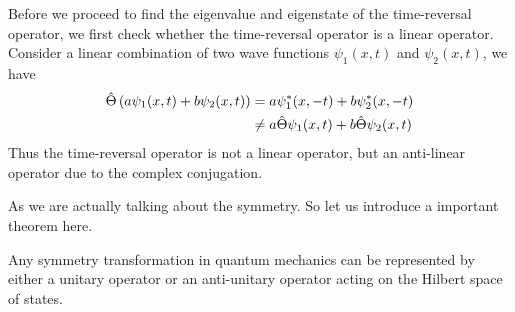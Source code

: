 Before we proceed to find the eigenvalue and eigenstate of the time-reversal operator, we first check whether the time-reversal operator is a linear operator. Consider a linear combination of two wave functions $\psi_1(x,t)$ and $\psi_2(x,t)$, we have
\begin{align*}
    \hat{\Theta} \left( a \psi_1(x,t) + b \psi_2(x,t) \right) &= a \psi_1^*(x,-t) + b \psi_2^*(x,-t) \\
    &\neq a \hat{\Theta} \psi_1(x,t) + b \hat{\Theta} \psi_2(x,t)
\end{align*}
Thus the time-reversal operator is not a linear operator, but an anti-linear operator due to the complex conjugation.

As we are actually talking about the symmetry. So let us introduce a important theorem here.
\begin{theorem}
    Any symmetry transformation in quantum mechanics can be represented by either a unitary operator or an anti-unitary operator acting on the Hilbert space of states.
\end{theorem}

